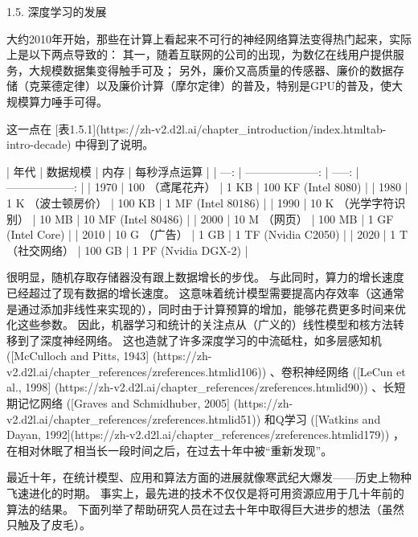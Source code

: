 1.5. 深度学习的发展

大约2010年开始，那些在计算上看起来不可行的神经网络算法变得热门起来，实际上是以下两点导致的： 其一，随着互联网的公司的出现，为数亿在线用户提供服务，大规模数据集变得触手可及； 另外，廉价又高质量的传感器、廉价的数据存储（克莱德定律）以及廉价计算（摩尔定律）的普及，特别是GPU的普及，使大规模算力唾手可得。

这一点在 [表1.5.1](https://zh-v2.d2l.ai/chapter\_introduction/index.htmltab-intro-decade) 
中得到了说明。



| 年代 |              数据规模 |   内存 |        每秒浮点运算 |
| ---: | --------------------: | -----: | ------------------: |
| 1970 |      100 （鸢尾花卉） |   1 KB | 100 KF (Intel 8080) |
| 1980 |    1 K （波士顿房价） | 100 KB |  1 MF (Intel 80186) |
| 1990 | 10 K （光学字符识别） |  10 MB | 10 MF (Intel 80486) |
| 2000 |         10 M （网页） | 100 MB |   1 GF (Intel Core) |
| 2010 |         10 G （广告） |   1 GB | 1 TF (Nvidia C2050) |
| 2020 |      1 T （社交网络） | 100 GB | 1 PF (Nvidia DGX-2) |

很明显，随机存取存储器没有跟上数据增长的步伐。 与此同时，算力的增长速度已经超过了现有数据的增长速度。 这意味着统计模型需要提高内存效率（这通常是通过添加非线性来实现的），同时由于计算预算的增加，能够花费更多时间来优化这些参数。 因此，机器学习和统计的关注点从（广义的）线性模型和核方法转移到了深度神经网络。 这也造就了许多深度学习的中流砥柱，如多层感知机 ([McCulloch and Pitts, 1943]
(https://zh-v2.d2l.ai/chapter\_references/zreferences.htmlid106)) 
、卷积神经网络 ([LeCun et al., 1998]
(https://zh-v2.d2l.ai/chapter\_references/zreferences.htmlid90)) 
、长短期记忆网络 ([Graves and Schmidhuber, 2005]
(https://zh-v2.d2l.ai/chapter\_references/zreferences.htmlid51)) 和Q学习 ([Watkins and Dayan, 1992](https://zh-v2.d2l.ai/chapter\_references/zreferences.htmlid179)) ，在相对休眠了相当长一段时间之后，在过去十年中被“重新发现”。

最近十年，在统计模型、应用和算法方面的进展就像寒武纪大爆发——历史上物种飞速进化的时期。 事实上，最先进的技术不仅仅是将可用资源应用于几十年前的算法的结果。 下面列举了帮助研究人员在过去十年中取得巨大进步的想法（虽然只触及了皮毛）。

